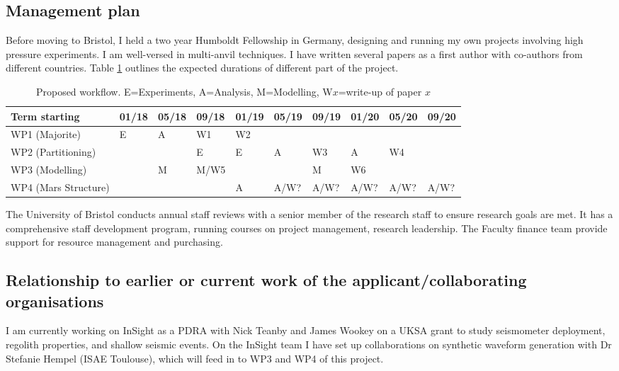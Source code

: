 \documentclass[11pt,twoside,a4paper]{article}
\begin{document}
\subsection*{Management plan}

Before moving to Bristol, I held a two year Humboldt Fellowship in Germany, designing and running my own projects involving high pressure experiments. I am well-versed in multi-anvil techniques. I have written several papers as a first author with co-authors from different countries. Table \ref{workflow} outlines the expected durations of different part of the project.

\begin{table}[!h]
\centering
\caption{Proposed workflow. E=Experiments, A=Analysis, M=Modelling, W$x$=write-up of paper $x$}
\label{workflow}
\begin{tabular}{l|lll|lll|lll}
  Term starting        & 01/18 & 05/18 & 09/18 & 01/19 & 05/19 & 09/19 & 01/20 & 05/20 & 09/20 \\
  \hline
  WP1 (Majorite)       & E          & A          & W1         & W2         &            &            &            &            &           \\
  WP2 (Partitioning)   &            &            & E          & E          & A          & W3         & A          & W4         &           \\
  WP3 (Modelling)      &            & M          & M/W5       &            &            & M          & W6         &            &           \\
  WP4 (Mars Structure) &            &            &            & A          & A/W?       & A/W?       & A/W?       & A/W?       & A/W?     
\end{tabular}
\end{table}

The University of Bristol conducts annual staff reviews with a senior member of the research staff to ensure research goals are met. It has a comprehensive staff development program, running courses on project management, research leadership. The Faculty finance team provide support for resource management and purchasing.



\subsection*{Relationship to earlier or current work of the applicant/collaborating organisations}

I am currently working on InSight as a PDRA with Nick Teanby and James Wookey on a UKSA grant to study seismometer deployment, regolith properties, and shallow seismic events. On the InSight team I have set up collaborations on synthetic waveform generation with Dr Stefanie Hempel (ISAE Toulouse), which will feed in to WP3 and WP4 of this project. 
\end{document}
